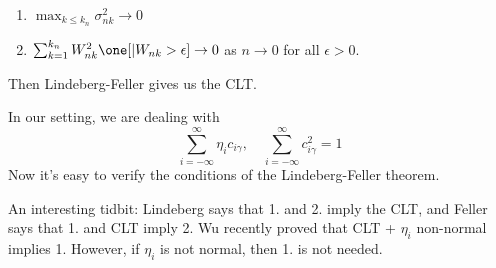 \begin{enumerate}
\tightlist
\item
  \(\max_{k \leq k_n} \sigma^2_{nk} \to 0\)
\item
  \(\sum_{k=1}^{k_n} W_{nk}^2 \one[|W_{nk} > \epsilon] \to 0\) as \(n \to 0\) for all \(\epsilon > 0\).
\end{enumerate}

Then Lindeberg-Feller gives us the CLT.

In our setting, we are dealing with
\[\sum_{i=-\infty}^\infty \eta_i c_{i\gamma}, \quad \sum_{i=-\infty}^\infty c_{i\gamma}^2 = 1\]
Now it's easy to verify the conditions of the Lindeberg-Feller theorem.

An interesting tidbit: Lindeberg says that 1. and 2. imply the CLT, and Feller says that 1. and CLT imply 2. Wu recently proved that CLT + \(\eta_i\) non-normal implies 1. However, if \(\eta_i\) is not normal, then 1. is not needed.

